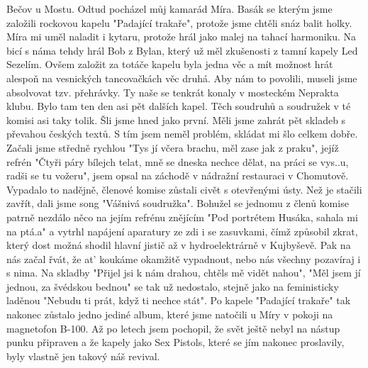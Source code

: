 
Bečov u Mostu. Odtud pocházel můj kamarád Míra. Basák se kterým jsme
založili rockovou kapelu "Padající trakaře", protože jsme chtěli snáz
balit holky. Míra mi uměl naladit i kytaru, protože hrál jako malej na
tahací harmoniku. Na bicí s náma tehdy hrál Bob z Bylan, který už měl
zkušenosti z tamní kapely Led Sezelím. Ovšem založit za totáče kapelu
byla jedna věc a mít možnost hrát alespoň na vesnických tancovačkách
věc druhá. Aby nám to povolili, museli jsme absolvovat tzv. přehrávky.
Ty naše se tenkrát konaly v mosteckém Neprakta klubu. Bylo tam ten den
asi pět dalších kapel. Těch soudruhů a soudružek v té komisi asi taky
tolik. Šli jsme hned jako první. Měli jsme zahrát pět skladeb s
převahou českých textů. S tím jsem neměl problém, skládat mi šlo
celkem dobře. Začali jsme středně rychlou "Tys jí včera brachu, měl
zase jak z praku", jejíž refrén "Čtyři páry bílejch telat, mně se
dneska nechce dělat, na práci se vys..u, radši se tu vožeru", jsem
opsal na záchodě v nádražní restauraci v Chomutově. Vypadalo to
nadějně, členové komise zůstali civět s otevřenými ústy. Než je
stačili zavřít, dali jsme song "Vášnivá soudružka". Bohužel se jednomu
z členů komise patrně nezdálo něco na jejím refrénu znějícím "Pod
portrétem Husáka, sahala mi na ptá.a" a vytrhl napájení aparatury ze
zdi i se zasuvkami, čímž způsobil zkrat, který dost možná shodil
hlavní jistič až v hydroelektrárně v Kujbyševě. Pak na nás začal řvát,
že at' koukáme okamžitě vypadnout, nebo nás všechny pozavíraj i s
nima. Na skladby "Přijel jsi k nám drahou, chtěls mě vidět nahou",
"Měl jsem jí jednou, za švédskou bednou" se tak už nedostalo, stejně
jako na feministicky laděnou "Nebudu ti prát, když ti nechce stát". Po
kapele "Padající trakaře" tak nakonec zůstalo jedno jediné album,
které jsme natočili u Míry v pokoji na magnetofon B-100. Až po letech
jsem pochopil, že svět ještě nebyl na nástup punku připraven a že
kapely jako Sex Pistols, které se jím nakonec proslavily, byly vlastně
jen takový náš revival.
